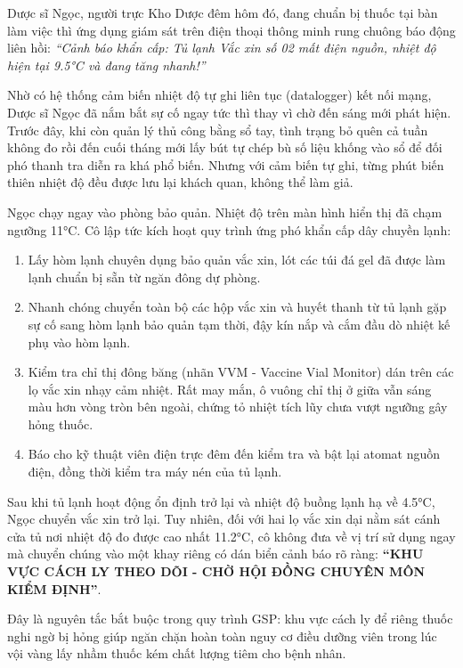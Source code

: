 \documentclass[12pt,a4paper]{article}
\begin{document}
Dược sĩ Ngọc, người trực Kho Dược đêm hôm đó, đang chuẩn bị thuốc tại bàn làm việc thì ứng dụng giám sát trên điện thoại thông minh rung chuông báo động liên hồi: \textit{``Cảnh báo khẩn cấp: Tủ lạnh Vắc xin số 02 mất điện nguồn, nhiệt độ hiện tại 9.5°C và đang tăng nhanh!''}

Nhờ có hệ thống cảm biến nhiệt độ tự ghi liên tục (datalogger) kết nối mạng, Dược sĩ Ngọc đã nắm bắt sự cố ngay tức thì thay vì chờ đến sáng mới phát hiện. Trước đây, khi còn quản lý thủ công bằng sổ tay, tình trạng bỏ quên cả tuần không đo rồi đến cuối tháng mới lấy bút tự chép bù số liệu khống vào sổ để đối phó thanh tra diễn ra khá phổ biến. Nhưng với cảm biến tự ghi, từng phút biến thiên nhiệt độ đều được lưu lại khách quan, không thể làm giả.

Ngọc chạy ngay vào phòng bảo quản. Nhiệt độ trên màn hình hiển thị đã chạm ngưỡng 11°C. Cô lập tức kích hoạt quy trình ứng phó khẩn cấp dây chuyền lạnh:
\begin{enumerate}[leftmargin=*]
    \item Lấy hòm lạnh chuyên dụng bảo quản vắc xin, lót các túi đá gel đã được làm lạnh chuẩn bị sẵn từ ngăn đông dự phòng.
    \item Nhanh chóng chuyển toàn bộ các hộp vắc xin và huyết thanh từ tủ lạnh gặp sự cố sang hòm lạnh bảo quản tạm thời, đậy kín nắp và cắm đầu dò nhiệt kế phụ vào hòm lạnh.
    \item Kiểm tra chỉ thị đông băng (nhãn VVM - Vaccine Vial Monitor) dán trên các lọ vắc xin nhạy cảm nhiệt. Rất may mắn, ô vuông chỉ thị ở giữa vẫn sáng màu hơn vòng tròn bên ngoài, chứng tỏ nhiệt tích lũy chưa vượt ngưỡng gây hỏng thuốc.
    \item Báo cho kỹ thuật viên điện trực đêm đến kiểm tra và bật lại atomat nguồn điện, đồng thời kiểm tra máy nén của tủ lạnh.
\end{enumerate}

Sau khi tủ lạnh hoạt động ổn định trở lại và nhiệt độ buồng lạnh hạ về 4.5°C, Ngọc chuyển vắc xin trở lại. Tuy nhiên, đối với hai lọ vắc xin dại nằm sát cánh cửa tủ nơi nhiệt độ đo được cao nhất 11.2°C, cô không đưa về vị trí sử dụng ngay mà chuyển chúng vào một khay riêng có dán biển cảnh báo rõ ràng: \textbf{``KHU VỰC CÁCH LY THEO DÕI - CHỜ HỘI ĐỒNG CHUYÊN MÔN KIỂM ĐỊNH''}. 

Đây là nguyên tắc bắt buộc trong quy trình GSP: khu vực cách ly để riêng thuốc nghi ngờ bị hỏng giúp ngăn chặn hoàn toàn nguy cơ điều dưỡng viên trong lúc vội vàng lấy nhầm thuốc kém chất lượng tiêm cho bệnh nhân.
\end{document}
